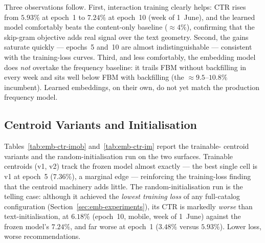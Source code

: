 Three observations follow. First, interaction training clearly helps: CTR rises
from $5.93\%$ at epoch~1 to $7.24\%$ at epoch~10 (week of 1~June), and the
learned model comfortably beats the content-only baseline ($\approx 4\%$),
confirming that the skip-gram objective adds real signal over the text geometry.
Second, the gains saturate quickly --- epochs~5 and~10 are almost
indistinguishable --- consistent with the training-loss curves. Third, and less
comfortably, the embedding model does \emph{not} overtake the frequency
baseline: it trails FBM without backfilling in every week and sits well below
FBM with backfilling (the $\approx 9.5$--$10.8\%$ incumbent). Learned
embeddings, on their own, do not yet match the production frequency model.

\subsection{Centroid Variants and Initialisation}
\label{sec:emb-variants-ctr}
Tables~\ref{tab:emb-ctr-imob} and~\ref{tab:emb-ctr-im} report the trainable-%
centroid variants and the random-initialisation run on the two surfaces.
Trainable centroids (v1, v2) track the frozen model almost exactly --- the best
single cell is v1 at epoch~5 ($7.36\%$), a marginal edge --- reinforcing the
training-loss finding that the centroid machinery adds little. The
random-initialisation run is the telling case: although it achieved the
\emph{lowest training loss} of any full-catalog configuration
(Section~\ref{sec:emb-experiments}), its CTR is markedly \emph{worse} than
text-initialisation, at $6.18\%$ (epoch~10, mobile, week of 1~June) against the
frozen model's $7.24\%$, and far worse at epoch~1 ($3.48\%$ versus $5.93\%$).
Lower loss, worse recommendations.


